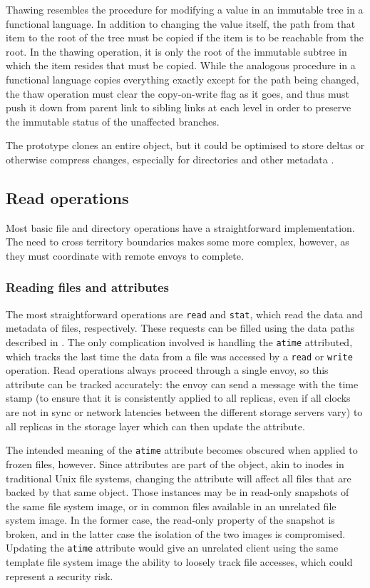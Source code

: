 Thawing resembles the procedure for modifying a value in an immutable tree in a functional language. In addition to changing the value itself, the path from that item to the root of the tree must be copied if the item is to be reachable from the root. In the thawing operation, it is only the root of the immutable subtree in which the item resides that must be copied. While the analogous procedure in a functional language copies everything exactly except for the path being changed, the thaw operation must clear the copy-on-write flag as it goes, and thus must push it down from parent link to sibling links at each level in order to preserve the immutable status of the unaffected branches.

The prototype clones an entire object, but it could be optimised to store deltas or otherwise compress changes, especially for directories and other metadata \cite{soules}.

\subsection{Read operations}

Most basic file and directory operations have a straightforward implementation. The need to cross territory boundaries makes some more complex, however, as they must coordinate with remote envoys to complete.

\subsubsection{Reading files and attributes}

The most straightforward operations are \texttt{read} and \texttt{stat}, which read the data and metadata of files, respectively. These requests can be filled using the data paths described in . The only complication involved is handling the \texttt{atime} attributed, which tracks the last time the data from a file was accessed by a \texttt{read} or \texttt{write} operation. Read operations always proceed through a single envoy, so this attribute can be tracked accurately: the envoy can send a message with the time stamp (to ensure that it is consistently applied to all replicas, even if all clocks are not in sync or network latencies between the different storage servers vary) to all replicas in the storage layer which can then update the attribute.

The intended meaning of the \texttt{atime} attribute becomes obscured when applied to frozen files, however. Since attributes are part of the object, akin to inodes in traditional Unix file systems, changing the attribute will affect all files that are backed by that same object. Those instances may be in read-only snapshots of the same file system image, or in common files available in an unrelated file system image. In the former case, the read-only property of the snapshot is broken, and in the latter case the isolation of the two images is compromised. Updating the \texttt{atime} attribute would give an unrelated client using the same template file system image the ability to loosely track file accesses, which could represent a security risk.

